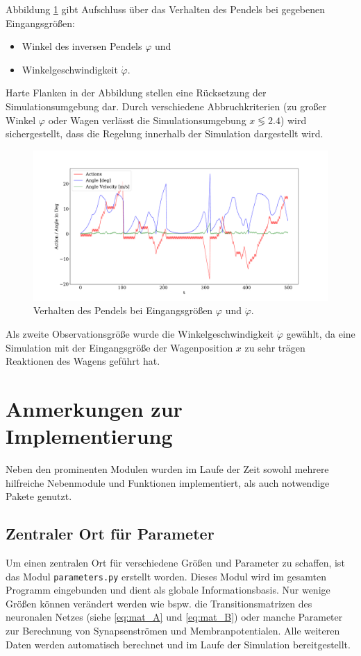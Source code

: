 	Abbildung \ref{fig:plot_action} gibt Aufschluss über das Verhalten des Pendels bei gegebenen Eingangsgrößen:
	\begin{itemize}
		\item Winkel des inversen Pendels $\varphi$ und
		\item Winkelgeschwindigkeit $\dot{\varphi}$.
	\end{itemize}
	Harte Flanken in der Abbildung stellen eine Rücksetzung der Simulationsumgebung dar. Durch verschiedene Abbruchkriterien (zu großer Winkel $\varphi$ oder Wagen verlässt die Simulationsumgebung $x\lessgtr2.4$) wird sichergestellt, dass die Regelung innerhalb der Simulation dargestellt wird.
	\begin{figure}[H]
		\centering
		\includegraphics[width=15cm]{figures/chap_implement/plot_action.pdf}
		\caption{Verhalten des Pendels bei Eingangsgrößen $\varphi$ und $\dot{\varphi}$.}
		\label{fig:plot_action}
	\end{figure}
	Als zweite Observationsgröße wurde die Winkelgeschwindigkeit $\dot{\varphi}$ gewählt, da eine Simulation mit der Eingangsgröße der Wagenposition $x$ zu sehr trägen Reaktionen des Wagens geführt hat.

\section{Anmerkungen zur Implementierung}
\label{sec:imp_sonst}
	Neben den prominenten Modulen wurden im Laufe der Zeit sowohl mehrere hilfreiche Nebenmodule und Funktionen implementiert, als auch notwendige Pakete genutzt.
	\subsection{Zentraler Ort für Parameter}
		Um einen zentralen Ort für verschiedene Größen und Parameter zu schaffen, ist das Modul \texttt{parameters.py} erstellt worden. Dieses Modul wird im gesamten Programm eingebunden und dient als globale Informationsbasis. Nur wenige Größen können verändert werden wie bspw. die Transitionsmatrizen des neuronalen Netzes (siehe \eqref{eq:mat_A} und \eqref{eq:mat_B}) oder manche Parameter zur Berechnung von Synapsenströmen und Membranpotentialen. Alle weiteren Daten werden automatisch berechnet und im Laufe der Simulation bereitgestellt.
